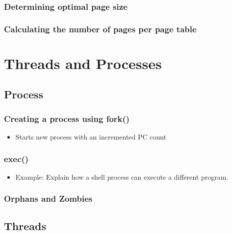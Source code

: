 \documentclass[11pt]{article}
\begin{document}
\subsubsection{Determining optimal page size}
\label{sec-5.5.5}

\subsubsection{Calculating the number of pages per page table}
\label{sec-5.5.6}

\section{Threads and Processes}
\label{sec-6}

\subsection{Process}
\label{sec-6.1}

\subsubsection{Creating a process using fork()}
\label{sec-6.1.1}

\begin{itemize}
\item Starts new process with an incremented PC count
\end{itemize}
\subsubsection{exec()}
\label{sec-6.1.2}

\begin{itemize}

\item Example: Explain how a shell process can execute a different program.\\
\label{sec-6.1.2.1}

\end{itemize} %
\subsubsection{Orphans and Zombies}
\label{sec-6.1.3}

\subsection{Threads}
\label{sec-6.2}
\end{document}

